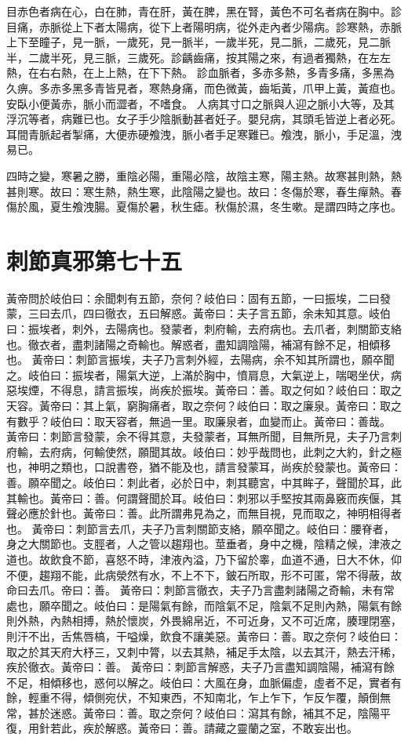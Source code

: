 目赤色者病在心，白在肺，青在肝，黃在脾，黑在腎，黃色不可名者病在胸中。診目痛，赤脈從上下者太陽病，從下上者陽明病，從外走內者少陽病。診寒熱，赤脈上下至瞳子，見一脈，一歲死，見一脈半，一歲半死，見二脈，二歲死，見二脈半，二歲半死，見三脈，三歲死。診齲齒痛，按其陽之來，有過者獨熱，在左左熱，在右右熱，在上上熱，在下下熱。
診血脈者，多赤多熱，多青多痛，多黑為久痹。多赤多黑多青皆見者，寒熱身痛，而色微黃，齒垢黃，爪甲上黃，黃疸也。安臥小便黃赤，脈小而澀者，不嗜食。
人病其寸口之脈與人迎之脈小大等，及其浮沉等者，病難已也。女子手少陰脈動甚者妊子。嬰兒病，其頭毛皆逆上者必死。耳間青脈起者掣痛，大便赤硬飧洩，脈小者手足寒難已。飧洩，脈小，手足溫，洩易已。

四時之變，寒暑之勝，重陰必陽，重陽必陰，故陰主寒，陽主熱。故寒甚則熱，熱甚則寒。故曰：寒生熱，熱生寒，此陰陽之變也。故曰：冬傷於寒，春生癉熱。春傷於風，夏生飧洩腸。夏傷於暑，秋生瘧。秋傷於濕，冬生嗽。是謂四時之序也。



\section{刺節真邪第七十五}

黃帝問於岐伯曰：余聞刺有五節，奈何？岐伯曰：固有五節，一曰振埃，二曰發蒙，三曰去爪，四曰徹衣，五曰解惑。黃帝曰：夫子言五節，余未知其意。岐伯曰：振埃者，刺外，去陽病也。發蒙者，刺府輸，去府病也。去爪者，刺關節支絡也。徹衣者，盡刺諸陽之奇輸也。解惑者，盡知調陰陽，補瀉有餘不足，相傾移也。
黃帝曰：刺節言振埃，夫子乃言刺外經，去陽病，余不知其所謂也，願卒聞之。岐伯曰：振埃者，陽氣大逆，上滿於胸中，憤肩息，大氣逆上，喘喝坐伏，病惡埃煙，不得息，請言振埃，尚疾於振埃。黃帝曰：善。取之何如？岐伯曰：取之天容。黃帝曰：其上氣，窮胸痛者，取之奈何？岐伯曰：取之廉泉。黃帝曰：取之有數乎？岐伯曰：取天容者，無過一里。取廉泉者，血變而止。黃帝曰：善哉。
黃帝曰：刺節言發蒙，余不得其意，夫發蒙者，耳無所聞，目無所見，夫子乃言刺府輸，去府病，何輸使然，願聞其故。岐伯曰：妙乎哉問也，此刺之大約，針之極也，神明之類也，口說書卷，猶不能及也，請言發蒙耳，尚疾於發蒙也。黃帝曰：善。願卒聞之。岐伯曰：刺此者，必於日中，刺其聽宮，中其眸子，聲聞於耳，此其輸也。黃帝曰：善。何謂聲聞於耳。岐伯曰：刺邪以手堅按其兩鼻竅而疾偃，其聲必應於針也。黃帝曰：善。此所謂弗見為之，而無目視，見而取之，神明相得者也。
黃帝曰：刺節言去爪，夫子乃言刺關節支絡，願卒聞之。岐伯曰：腰脊者，身之大關節也。支脛者，人之管以趨翔也。莖垂者，身中之機，陰精之候，津液之道也。故飲食不節，喜怒不時，津液內溢，乃下留於睾，血道不通，日大不休，仰不便，趨翔不能，此病滎然有水，不上不下，鈹石所取，形不可匿，常不得蔽，故命曰去爪。帝曰：善。
黃帝曰：刺節言徹衣，夫子乃言盡刺諸陽之奇輸，未有常處也，願卒聞之。岐伯曰：是陽氣有餘，而陰氣不足，陰氣不足則內熱，陽氣有餘則外熱，內熱相搏，熱於懷炭，外畏綿帛近，不可近身，又不可近席，腠理閉塞，則汗不出，舌焦唇槁，干嗌燥，飲食不讓美惡。黃帝曰：善。取之奈何？岐伯曰：取之於其天府大杼三，又刺中膂，以去其熱，補足手太陰，以去其汗，熱去汗稀，疾於徹衣。黃帝曰：善。
黃帝曰：刺節言解惑，夫子乃言盡知調陰陽，補瀉有餘不足，相傾移也，惑何以解之。岐伯曰：大風在身，血脈偏虛，虛者不足，實者有餘，輕重不得，傾側宛伏，不知東西，不知南北，乍上乍下，乍反乍覆，顛倒無常，甚於迷惑。黃帝曰：善。取之奈何？岐伯曰：瀉其有餘，補其不足，陰陽平復，用針若此，疾於解惑。黃帝曰：善。請藏之靈蘭之室，不敢妄出也。

